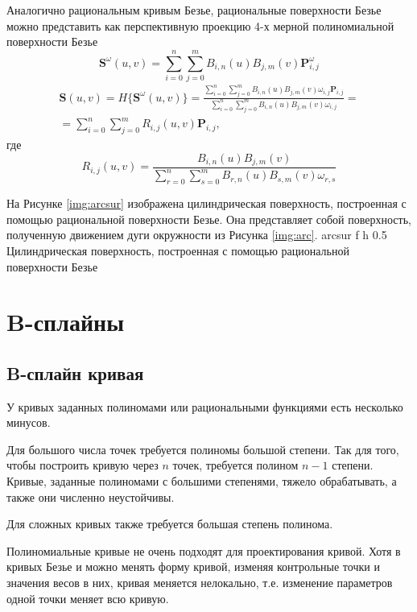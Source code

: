 \documentclass{bmstu}
\newenvironment{gost-itemize}
{\begin{itemize}[label=---,itemindent=\parindent,leftmargin=0pt]}
	{\end{itemize}}
\begin{document}
Аналогично рациональным кривым Безье, рациональные поверхности Безье можно представить как перспективную проекцию 4-х мерной полиномиальной поверхности Безье
\[
    \mathbf{S}^\omega(u, v) = \sum\limits_{i=0}^n\sum\limits_{j=0}^mB_{i,n}(u)B_{j,m}(v)\mathbf{P}^\omega_{i,j}
\]
\begin{multline}
    \mathbf{S}(u,v) = H\{\mathbf{S}^\omega(u, v)\} =  \frac{\sum\limits_{i=0}^n\sum\limits_{j=0}^mB_{i,n}(u)B_{j,m}(v)\omega_{i, j}\mathbf{P}_{i,j}}{\sum\limits_{i=0}^n\sum\limits_{j=0}^mB_{i,n}(u)B_{j,m}(v)\omega_{i, j}} =\\= \sum\limits_{i=0}^n\sum\limits_{j=0}^mR_{i,j}(u,v)\mathbf{P}_{i,j},
\end{multline}
где
\begin{equation}
    R_{i,j}(u, v) = \frac{B_{i, n}(u)B_{j, m}(v)}{\sum\limits_{r=0}^n\sum\limits_{s=0}^mB_{r,n}(u)B_{s,m}(v)\omega_{r, s}}
\end{equation}

На Рисунке \ref{img:arcsur} изображена цилиндрическая поверхность, построенная с помощью рациональной поверхности Безье. Она представляет собой поверхность, полученную движением дуги окружности из Рисунка \ref{img:arc}.
{arcsur} %
{f} %
{h} %
{0.5\textwidth} %
{Цилиндрическая поверхность, построенная с помощью рациональной поверхности Безье} %

\section{B-сплайны}

\subsection{B-сплайн кривая}

У кривых заданных полиномами или рациональными функциями есть несколько минусов.
\begin{gost-itemize}
    \item Для большого числа точек требуется полиномы большой степени. Так для того, чтобы построить кривую через $n$ точек, требуется полином $n-1$ степени. Кривые, заданные полиномами с большими степенями, тяжело обрабатывать, а также они численно неустойчивы.
    \item Для сложных кривых также требуется большая степень полинома.
    \item Полиномиальные кривые не очень подходят для проектирования кривой. Хотя в кривых Безье и можно менять форму кривой, изменяя контрольные точки и  значения весов в них, кривая меняется нелокально, т.е. изменение параметров одной точки меняет всю кривую.
\end{gost-itemize}
\end{document}
